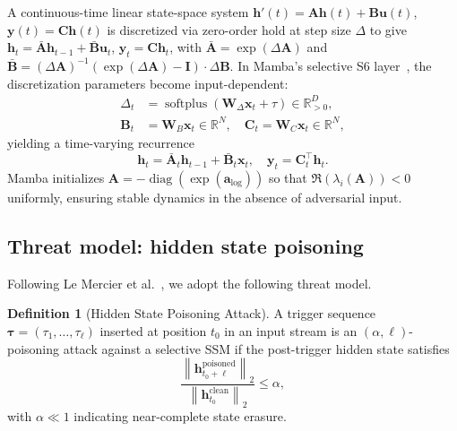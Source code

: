 \documentclass[journal,a4paper,10pt]{IEEEtran}
\theoremstyle{definition}
\newtheorem{definition}{Definition}
\theoremstyle{remark}
\newcommand{\R}{\mathbb{R}}
\newcommand{\norm}[1]{\left\|#1\right\|}
\DeclareMathOperator{\softplus}{softplus}
\DeclareMathOperator{\diag}{diag}
\begin{document}
A continuous-time linear state-space system $\mathbf{h}'(t) = \mathbf{A} \mathbf{h}(t) + \mathbf{B} \mathbf{u}(t)$, $\mathbf{y}(t) = \mathbf{C} \mathbf{h}(t)$ is discretized via zero-order hold at step size $\Delta$ to give $\mathbf{h}_t = \bar{\mathbf{A}} \mathbf{h}_{t-1} + \bar{\mathbf{B}} \mathbf{u}_t$, $\mathbf{y}_t = \mathbf{C} \mathbf{h}_t$, with $\bar{\mathbf{A}} = \exp(\Delta \mathbf{A})$ and $\bar{\mathbf{B}} = (\Delta \mathbf{A})^{-1}(\exp(\Delta \mathbf{A}) - \mathbf{I}) \cdot \Delta \mathbf{B}$. In Mamba's selective S6 layer~\cite{gu2024mamba}, the discretization parameters become input-dependent:
\begin{align}
    \Delta_t &= \softplus(\mathbf{W}_\Delta \mathbf{x}_t + \tau) \in \R_{>0}^D,
    \label{eq:delta}\\
    \mathbf{B}_t &= \mathbf{W}_B \mathbf{x}_t \in \R^N,\quad
    \mathbf{C}_t = \mathbf{W}_C \mathbf{x}_t \in \R^N,
    \label{eq:bc}
\end{align}
yielding a time-varying recurrence
\begin{equation}
    \mathbf{h}_t = \bar{\mathbf{A}}_t \mathbf{h}_{t-1} + \bar{\mathbf{B}}_t \mathbf{x}_t,\quad
    \mathbf{y}_t = \mathbf{C}_t^\top \mathbf{h}_t.
    \label{eq:s6}
\end{equation}
Mamba initializes $\mathbf{A} = -\diag(\exp(\mathbf{a}_{\log}))$ so that $\Re(\lambda_i(\mathbf{A})) < 0$ uniformly, ensuring stable dynamics in the absence of adversarial input.

\subsection{Threat model: hidden state poisoning}

Following Le Mercier et al.~\cite{lemercier2026hispa}, we adopt the following threat model.

\begin{definition}[Hidden State Poisoning Attack]
\label{def:hispa}
A trigger sequence $\bm{\tau} = (\tau_1, \ldots, \tau_\ell)$ inserted at position $t_0$ in an input stream is an $(\alpha, \ell)$-poisoning attack against a selective SSM if the post-trigger hidden state satisfies
\begin{equation}
    \frac{\norm{\mathbf{h}_{t_0+\ell}^{\mathrm{poisoned}}}_2}{\norm{\mathbf{h}_{t_0}^{\mathrm{clean}}}_2} \leq \alpha,
    \label{eq:hispa}
\end{equation}
with $\alpha \ll 1$ indicating near-complete state erasure.
\end{definition}
\end{document}
